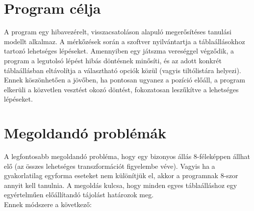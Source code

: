 \documentclass[a4paper, 11pt]{article}
\begin{document}
\section{Program célja}
\indent A program egy hibavezérelt, visszacsatoláson alapuló megerősítéses tanulási modellt alkalmaz. A mérkőzések során a szoftver nyilvántartja a táblaállásokhoz tartozó lehetséges lépéseket. Amennyiben egy játszma vereséggel végződik, a program a legutolsó lépést hibás döntésnek minősíti, és az adott konkrét táblaállásban eltávolítja a választható opciók közül (vagyis tiltólistára helyezi). Ennek köszönhetően a jövőben, ha pontosan ugyanez a pozíció előáll, a program elkerüli a közvetlen vesztést okozó döntést, fokozatosan leszűkítve a lehetséges lépéseket.

\section{Megoldandó problémák}
\indent A legfontosabb megoldandó probléma, hogy egy bizonyos állás 8-féleképpen állhat elő (az összes lehetséges transzformációt figyelembe véve). Vagyis ha a gyakorlatilag egyforma eseteket nem különítjük el, akkor a programnak 8-szor annyit kell tanulnia. A megoldás kulcsa, hogy minden egyes táblaálláshoz egy egyértelműen előállítandó tájolást határozok meg. \\
\indent Ennek módszere a következő:
\end{document}
